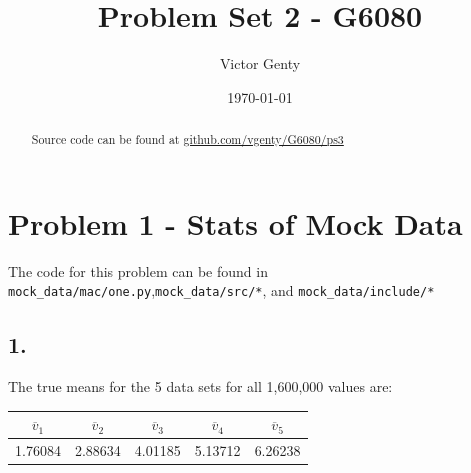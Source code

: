 \documentclass[singlepage,notitlepage,nofootinbib,11pt]{revtex4-1}
\begin{document}
\title{Problem Set 2 - G6080}
\author{Victor Genty}
\date{\today}
\begin{abstract}
\centering
Source code can be found at \href{https://github.com/vgenty/G6080/tree/master/ps3}{github.com/vgenty/G6080/ps3}
\end{abstract}
\maketitle
\section{Problem 1 - Stats of Mock Data}
\begin{center}The code for this problem can be found in \verb|mock_data/mac/one.py|,\verb|mock_data/src/*|, and \verb|mock_data/include/*| \end{center}
\subsection{1.}
The true means for the 5 data sets for all 1,600,000 values are:
\begin{center}
\begin{tabular}{ | c | c | c | c | c |}\hline
  $\overline{v}_1$ &  $\overline{v}_2$ &  $\overline{v}_3$ &  $\overline{v}_4$ &  $\overline{v}_5$  \\ \hline \hline 
  1.76084 & 2.88634 & 4.01185 & 5.13712 & 6.26238 \\ \hline
\end{tabular}
\end{center}
\end{document}

